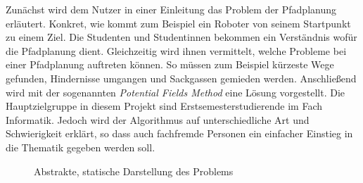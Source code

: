 
Zunächst wird dem Nutzer in einer Einleitung das Problem der Pfadplanung erläutert. Konkret, wie kommt zum Beispiel ein Roboter von seinem Startpunkt zu einem Ziel. Die Studenten und Studentinnen bekommen ein Verständnis wofür die Pfadplanung dient. Gleichzeitig wird ihnen vermittelt, welche Probleme bei einer Pfadplanung auftreten können. So müssen zum Beispiel kürzeste Wege gefunden, Hindernisse umgangen und Sackgassen gemieden werden. Anschließend wird mit der sogenannten \textit{Potential Fields Method} eine Lösung vorgestellt. Die Hauptzielgruppe in diesem Projekt sind Erstsemesterstudierende im Fach Informatik. Jedoch wird der Algorithmus auf unterschiedliche Art und Schwierigkeit erklärt, so dass auch fachfremde Personen ein einfacher Einstieg in die Thematik gegeben werden soll. 


\begin{figure}[ht!]
  \centering
  \caption{Abstrakte, statische Darstellung des Problems}
  \label{fig:bbstatic}
\end{figure}



